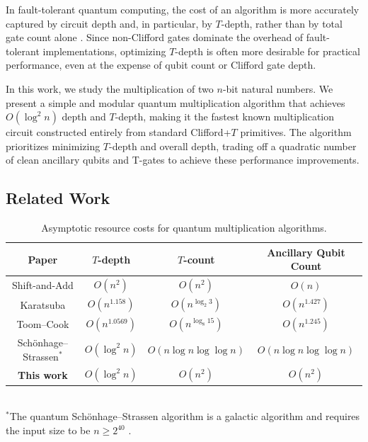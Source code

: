 \documentclass[reprint,amsmath,amssymb,aps,pra]{revtex4-2}
\begin{document}
In fault-tolerant quantum computing, the cost of an algorithm is more accurately
captured by circuit depth and, in particular, by $T$-depth, rather than
by total gate count alone \cite{Selinger2013,Amy2012}. Since non-Clifford gates
dominate the overhead of fault-tolerant implementations, optimizing $T$-depth is
often more desirable for practical performance, even at the expense of qubit
count or Clifford gate depth.

In this work, we study the multiplication of two $n$-bit natural numbers. We present a simple and modular quantum multiplication algorithm
that achieves $O(\log^2 n)$ depth and $T$-depth, making it the fastest known
multiplication circuit constructed entirely from standard Clifford+$T$
primitives. The algorithm prioritizes minimizing $T$-depth and overall depth, trading off a
quadratic number of clean ancillary qubits and T-gates to achieve these performance
improvements. 

\subsection{Related Work}

\begin{table}[t]
    \centering
    \caption{Asymptotic resource costs for quantum multiplication algorithms.}
    \begin{tabular}{|c|c|c|c|}
    \hline
        Paper & $T$-depth & $T$-count & Ancillary Qubit Count\\\hline
        Shift-and-Add \cite{Munoz-Coreas2019} 
        & $O(n^2)$  
        & $O(n^2)$ 
        & $O(n)$\\\hline
        Karatsuba \cite{parent2017improvedreversiblequantumcircuits} 
        & $O(n^{1.158})$ 
        & $O(n^{\log_2 3})$ 
        & $O(n^{1.427})$\\\hline
        Toom--Cook \cite{Putranto2023} 
        & $O(n^{1.0569})$ 
        & $O(n^{\log_8 15})$ 
        & $O(n^{1.245})$\\\hline
        Schönhage--Strassen$^{*}$ \cite{Nie2023}
        & $O(\log^2 n)$  
        & $O(n\log n\log\log n)$ 
        & $O(n\log n\log\log n)$\\\hline
        \textbf{This work} 
        & $O(\log^2 n)$  
        & $O(n^2)$ 
        & $O(n^2)$\\\hline
    \end{tabular}\\
    \footnotesize
    $^{*}$The quantum Schönhage--Strassen algorithm is a galactic algorithm and requires the input size to be $n \geq 2^{40}$ \cite{Nie2023}.
    
    \label{table:compare_asymp}
\end{table}
\end{document}
